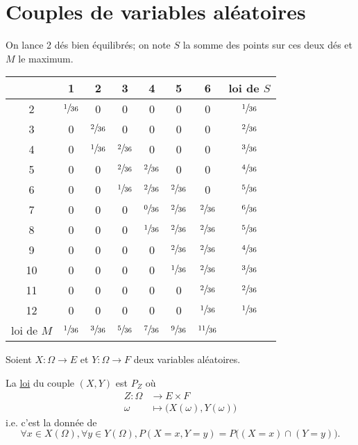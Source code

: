 \part{Couples de variables aléatoires}

\begin{exm}
	On lance 2 dés bien équilibrés; on note $S$ la somme des points sur ces deux dés et $M$ le maximum.

	\begin{center}
		\begin{tabular}{c|cccccc|c}
			\diagbox{$S$}{$M$}&1&2&3&4&5&6&loi de $S$ \\ \hline
			2 &$\sfrac{1}{36}$&0&0&0&0&0&$\sfrac{1}{36}$\\
			3 &0&$\sfrac{2}{36}$&0&0&0&0&$\sfrac{2}{36}$\\
			4 &0&$\sfrac{1}{36}$&$\sfrac{2}{36}$&0&0&0&$\sfrac{3}{36}$\\
			5 &0&0&$\sfrac{2}{36}$&$\sfrac{2}{36}$&0&0&$\sfrac{4}{36}$\\
			6 &0&0&$\sfrac{1}{36}$&$\sfrac{2}{36}$&$\sfrac{2}{36}$&0&$\sfrac{5}{36}$\\
			7 &0&0&0&$\sfrac{0}{36}$&$\sfrac{2}{36}$&$\sfrac{2}{36}$&$\sfrac{6}{36}$\\
			8 &0&0&0&$\sfrac{1}{36}$&$\sfrac{2}{36}$&$\sfrac{2}{36}$&$\sfrac{5}{36}$\\
			9 &0&0&0&0&$\sfrac{2}{36}$&$\sfrac{2}{36}$&$\sfrac{4}{36}$\\
			10&0&0&0&0&$\sfrac{1}{36}$&$\sfrac{2}{36}$&$\sfrac{3}{36}$\\
			11&0&0&0&0&0&$\sfrac{2}{36}$&$\sfrac{2}{36}$\\
			12&0&0&0&0&0&$\sfrac{1}{36}$&$\sfrac{1}{36}$\\\hline
			loi de $M$&$\sfrac{1}{36}$&$\sfrac{3}{36}$&$\sfrac{5}{36}$&$\sfrac{7}{36}$&$\sfrac{9}{36}$&$\sfrac{11}{36}$&
		\end{tabular}
	\end{center}
\end{exm}

\begin{defn}
	Soient $X : \Omega \to E$ et $Y : \Omega \to F$ deux variables aléatoires.

	La \underline{loi} du couple $(X,Y)$ est $P_Z$ où  \begin{align*}
		Z: \Omega &\longrightarrow E\times F \\
		\omega &\longmapsto \big(X(\omega),Y(\omega)\big)
	\end{align*}
	i.e. c'est la donnée de \[
		\forall x \in X(\Omega),\forall y \in Y(\Omega),P(X = x, Y = y) = P\big((X=x)\cap (Y=y)\big)
	.\]
\end{defn}

